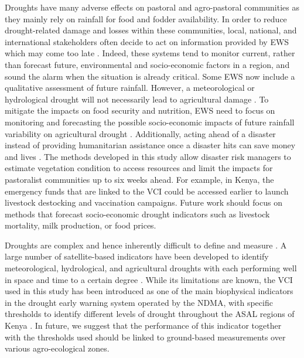 \documentclass[review]{elsarticle}
\begin{document}
Droughts  have many adverse effects on pastoral and agro-pastoral communities as they mainly rely on rainfall for food and fodder availability. In order to reduce drought-related damage and losses within these communities, local, national, and international stakeholders often decide to act on information provided by EWS which may come too late \citep{tand}. Indeed, these systems tend to monitor current, rather than forecast future, environmental and socio-economic factors in a region, and sound the alarm when the situation is already critical. Some EWS now include a qualitative assessment of future rainfall. However, a meteorological or hydrological drought will not necessarily lead to agricultural damage \citep{BHUIYAN2006289}. To mitigate the impacts on food security and nutrition, EWS need to focus on monitoring and forecasting the possible socio-economic impacts of future rainfall variability on agricultural drought \citep{wmo2015wmo}. Additionally, acting ahead of a disaster instead of providing humanitarian assistance once a disaster hits can save money and lives \citep{venton2012economics}. The methods developed in this study allow disaster risk managers to estimate vegetation condition to access resources and limit the impacts for pastoralist communities up to six weeks ahead. For example, in Kenya, the emergency funds that are linked to the VCI could be accessed earlier to launch livestock destocking and vaccination campaigns. Future work should focus on methods that forecast socio-economic drought indicators such as livestock mortality, milk production, or food prices. 

Droughts are complex and hence inherently difficult to define and measure \citep{MISHRA2010202}. A large number of satellite-based indicators have been developed to identify meteorological, hydrological, and agricultural droughts \citep{zargar2011review,aghakouchak2015remote} with each performing well in space and time to a certain degree \citep{ZHANG201796}. While its limitations are known, the VCI used in this study has been introduced as one of the main biophysical indicators in the drought early warning system operated by the NDMA, with specific thresholds to identify different levels of drought throughout the ASAL regions of Kenya \citep{rs8040267}. In future, we suggest that the performance of this indicator together with the thresholds used should be linked to ground-based measurements over various agro-ecological zones.
\end{document}
